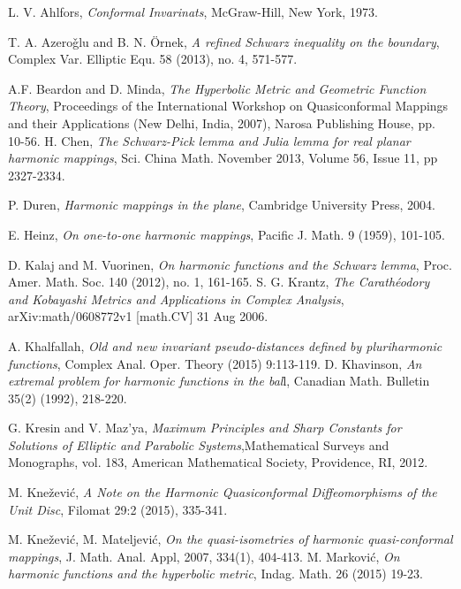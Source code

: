 \documentclass{amsart}
\begin{document}
\begin{thebibliography}{MM}

 L. V. Ahlfors, \emph{Conformal Invarinats}, McGraw-Hill, New York, 1973.

   T. A. Azero\v glu and B. N. \"{O}rnek,
{\it  A refined Schwarz  inequality on  the boundary},   Complex Var.
Elliptic Equ. 58  (2013), no. 4, 571-577.

 A.F. Beardon and D. Minda, \emph{The Hyperbolic Metric and Geometric Function
Theory}, Proceedings of the International Workshop on Quasiconformal
Mappings and their Applications (New Delhi, India, 2007), Narosa Publishing House,
pp. 10-56.
   H.  Chen, {\it The Schwarz-Pick lemma and Julia lemma for real planar harmonic mappings},  Sci. China Math.  November 2013, Volume 56, Issue 11, pp 2327-2334.

 P. Duren, \emph{Harmonic mappings in the plane}, Cambridge University Press, 2004.

 E. Heinz, \emph{On one-to-one harmonic mappings}, Pacific J. Math. 9 (1959), 101-105.

  D. Kalaj and M.  Vuorinen, {\it  On harmonic functions and the Schwarz lemma},  Proc. Amer. Math. Soc. 140 (2012), no. 1, 161-165.
   S. G. Krantz,  {\it   The Carath\'{e}odory and    Kobayashi Metrics  and Applications in Complex  Analysis},
arXiv:math/0608772v1  [math.CV]  31 Aug 2006.

  A. Khalfallah,  {\it  Old and new invariant
pseudo-distances defined by pluriharmonic functions},  Complex Anal. Oper. Theory (2015) 9:113-119.
D. Khavinson, \emph{An extremal problem for harmonic
functions in the bal}l, Canadian Math. Bulletin 35(2) (1992), 218-220.


   G. Kresin and V. Maz'ya,  \emph{Maximum Principles and Sharp Constants for
Solutions of Elliptic and Parabolic Systems},Mathematical Surveys and Monographs, vol.
183, American Mathematical Society, Providence, RI, 2012.


 M. Kne\v zevi\' c, \emph{A Note on the Harmonic Quasiconformal Diffeomorphisms of the Unit Disc}, Filomat 29:2 (2015), 335-341.

 M. Kne\v zevi\' c, M. Mateljevi\' c, \emph{On the quasi-isometries of harmonic quasi-conformal
mappings}, J. Math.  Anal.  Appl,  2007, 334(1), 404-413.
 M. Markovi\'c, {\it On harmonic functions and the hyperbolic metric}, Indag. Math. 26 (2015) 19-23.




\end{thebibliography}
\end{document}
